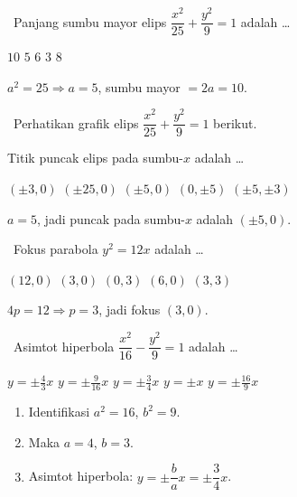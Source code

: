 \documentclass[11pt,a4paper]{exam}
\newenvironment{langkah}{%
  \begin{enumerate}[label=\textbf{Langkah \arabic*:},leftmargin=2.6em,
    itemsep=2pt,topsep=2pt]}{\end{enumerate}}
\newcommand{\Inter}{{\footnotesize\textsf{\textcolor{biru}{[Intermediate]}}}\ }
\newcommand{\Adv}{{\footnotesize\textsf{\textcolor{oranye}{[Advanced]}}}\ }
\begin{document}
\begin{questions}
\question \Inter Panjang sumbu mayor elips $\dfrac{x^{2}}{25} + \dfrac{y^{2}}{9} = 1$ adalah \dots
\begin{choices}
\CorrectChoice $10$ \choice $5$ \choice $6$ \choice $3$ \choice $8$
\end{choices}
\begin{solution}$a^{2}=25 \Rightarrow a=5$, sumbu mayor $= 2a = 10.$\end{solution}

\question \Inter Perhatikan grafik elips $\dfrac{x^{2}}{25} + \dfrac{y^{2}}{9} = 1$ berikut.

\begin{center}
\end{center}

Titik puncak elips pada sumbu-$x$ adalah \dots
\begin{choices}
\choice $(\pm 3, 0)$ \choice $(\pm 25, 0)$ \CorrectChoice $(\pm 5, 0)$
\choice $(0, \pm 5)$ \choice $(\pm 5, \pm 3)$
\end{choices}
\begin{solution}$a=5$, jadi puncak pada sumbu-$x$ adalah $(\pm 5, 0).$\end{solution}

\question \Inter Fokus parabola $y^{2} = 12x$ adalah \dots
\begin{choices}
\choice $(12,0)$ \CorrectChoice $(3,0)$ \choice $(0,3)$ \choice $(6,0)$ \choice $(3,3)$
\end{choices}
\begin{solution}$4p=12 \Rightarrow p=3$, jadi fokus $(3,0).$\end{solution}

\question \Adv Asimtot hiperbola $\dfrac{x^{2}}{16} - \dfrac{y^{2}}{9} = 1$ adalah \dots
\begin{choices}
\choice $y = \pm\tfrac{4}{3}x$ \choice $y = \pm\tfrac{9}{16}x$ \CorrectChoice $y = \pm\tfrac{3}{4}x$
\choice $y = \pm x$ \choice $y = \pm\tfrac{16}{9}x$
\end{choices}
\begin{solution}
\begin{langkah}
\item Identifikasi $a^{2}=16$, $b^{2}=9$.
\item Maka $a=4$, $b=3$.
\item Asimtot hiperbola: $y = \pm\dfrac{b}{a}x = \pm\dfrac{3}{4}x$.
\end{langkah}
\end{solution}


\end{questions}
\end{document}
